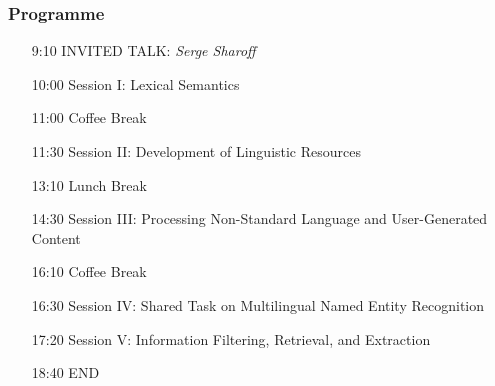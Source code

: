 \documentclass{beamer}
\begin{document}






\begin{frame}
 \frametitle{Programme}

\begin{itemize}

\item[9:10] INVITED TALK: \textit{Serge Sharoff}

\item[10:00] Session I: Lexical Semantics

\item[11:00] {\color{darkgreen}Coffee Break}

\item[11:30] Session II: Development of Linguistic Resources

\item[13:10] {\color{darkgreen}Lunch Break}

\item[14:30] Session III: Processing Non-Standard Language and User-Generated Content

\item[16:10] {\color{darkgreen}Coffee Break}

\item[16:30] Session IV: Shared Task on Multilingual Named Entity Recognition

\item[17:20] Session V: Information Filtering, Retrieval, and Extraction

\item[18:40] END 

\end{itemize}

\end{frame}
\end{document}
